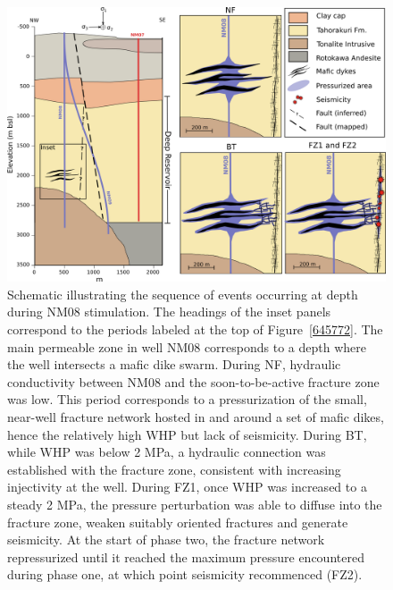 \begin{figure}[h!]
\begin{center}
\includegraphics[width=1.00\columnwidth]{Chapter_3_Nga/figures/NM08_stimulation_cartoon/NM08_stimulation_cartoon_original}
\caption{{Schematic illustrating the sequence of events occurring at depth during
NM08 stimulation. The headings of the inset panels correspond to the
periods labeled at the top of Figure~{\ref{645772}}.
The main permeable zone in well NM08 corresponds to a depth where the
well intersects a mafic dike swarm. During NF, hydraulic conductivity
between NM08 and the soon-to-be-active fracture zone was low. This
period corresponds to a pressurization of the small, near-well fracture
network hosted in and around a set of mafic dikes, hence the relatively
high WHP but lack of seismicity. During BT, while WHP was below 2 MPa, a
hydraulic connection was established with the fracture zone, consistent
with increasing injectivity at the well. During FZ1, once WHP was
increased to a steady 2 MPa, the pressure perturbation was able to
diffuse into the fracture zone, weaken suitably oriented fractures and
generate seismicity. At the start of phase two, the fracture network
repressurized until it reached the maximum pressure encountered during
phase one, at which point seismicity recommenced (FZ2).
{\label{740510}}%
}}
\end{center}
\end{figure}

